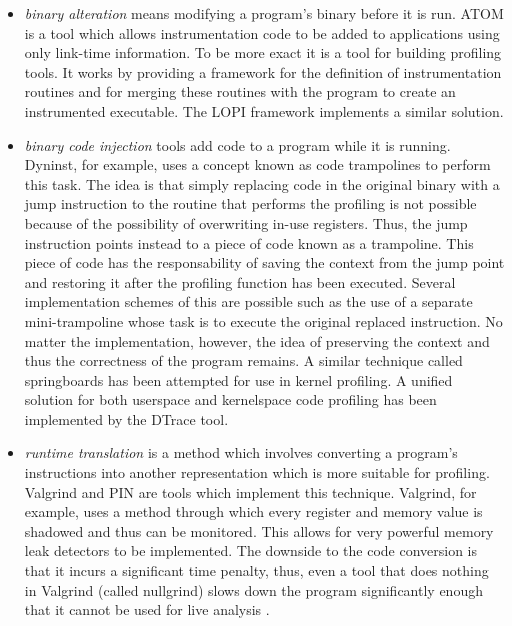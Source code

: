 \begin{itemize}
\item \textit{binary alteration} means modifying a program's binary before it is run. ATOM\cite{Srivastava94} is a tool which allows instrumentation code to be added to applications using only link-time information. To be more exact it is a tool for building profiling tools. It works by providing a framework for the definition of instrumentation routines and for merging these routines with the program to create an instrumented executable. The LOPI framework\cite{Kagstrom05} implements a similar solution.
\item \textit{binary code injection} tools add code to a program while it is running. Dyninst\cite{Buck00}, for example, uses a concept known as code trampolines to perform this task. The idea is that simply replacing code in the original binary with a jump instruction to the routine that performs the profiling is not possible because of the possibility of overwriting in-use registers. Thus, the jump instruction points instead to a piece of code known as a trampoline. This piece of code has the responsability of saving the context from the jump point and restoring it after the profiling function has been executed. Several implementation schemes of this are possible such as the use of a separate mini-trampoline whose task is to execute the original replaced instruction. No matter the implementation, however, the idea of preserving the context and thus the correctness of the program remains. A similar technique called springboards has been attempted for use in kernel profiling\cite{Tamches99}. A unified solution for both userspace and kernelspace code profiling has been implemented by the DTrace tool\cite{Cantrill04}.
\item \textit{runtime translation} is a method which involves converting a program's instructions into another representation which is more suitable for profiling. Valgrind\cite{Nethercote07} and PIN\cite{Luk05} are tools which implement this technique. Valgrind, for example, uses a method through which every register and memory value is shadowed and thus can be monitored. This allows for very powerful memory leak detectors to be implemented. The downside to the code conversion is that it incurs a significant time penalty, thus, even a tool that does nothing in Valgrind (called nullgrind) slows down the program significantly enough that it cannot be used for live analysis \cite{Newsome05}.
\end{itemize}

